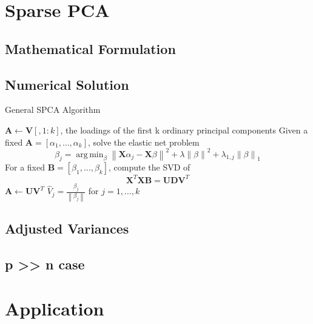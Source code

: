 \documentclass{beamer}
\theoremstyle{plain}
\theoremstyle{definition}
\newcommand{\mat}[1]{\mathbf{#1}}
\DeclareMathOperator*{\argmin}{arg\,min}
\newcommand{\norm}[1]{\left\lVert #1 \right\rVert}
\begin{document}
\section{Sparse PCA}

\subsection{Mathematical Formulation}
\subsection{Numerical Solution}

\begin{frame}
\begin{algorithm}[H]
  \scriptsize
    \caption{General SPCA Algorithm}
    \begin{algorithmic}[1]
        	\State $\mat A \gets \mat V[,1 \colon k]$, the loadings of the first k ordinary principal components
             
                \State Given a fixed $\mat A = [\alpha_1, \ldots, \alpha_k]$, solve the elastic net problem $$\beta_j = \argmin_{\beta} \norm{\mat X \alpha_j - \mat X \beta}^{2} + \lambda \norm{\beta}^2 + \lambda_{1,j}\norm{\beta}_{1}$$
                \State For a fixed $\mat B = [\beta_1, \ldots, \beta_k]$, compute the SVD of $$\mat X^T \mat X \mat B = \mat U \mat D \mat V^T$$
                \State $\mat A \gets \mat U \mat V^T$
            \EndWhile
            \State $\hat{V}_j = \frac{\beta_j}{\norm{\beta_j}}$ for $j = 1, \ldots, k$
        \EndProcedure
    \end{algorithmic}
\end{algorithm} 
\end{frame}

\subsection{Adjusted Variances}
\subsection{p >> n case}


\section{Application}
\end{document}
